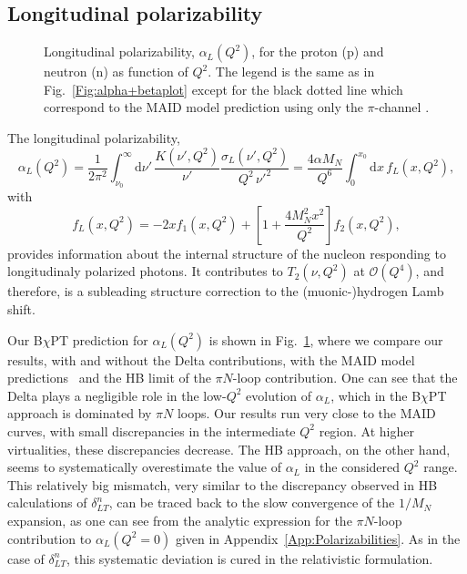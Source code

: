 \documentclass[11pt,preprint,tightenlines,
showpacs,preprintnumbers,amsmath,amssymb,superscriptaddress,a4paper,nofootinbib]{revtex4-1}
\def\beq{\begin{equation}}
\def\eeq{\end{equation}}
\def\al{\alpha}
\def\nn{\nonumber}
\def\dd{\mathrm{d}}
\begin{document}
\subsection{Longitudinal polarizability}

\begin{figure}[hbt]
\begin{center}
\hspace{0.5cm}
\caption{Longitudinal polarizability, $\alpha_L (Q^2)$, for the proton  (p) and neutron (n) as function of $Q^2$. The legend is the same as in Fig.~\ref{Fig:alpha+betaplot} except for the black dotted line which correspond to the MAID model prediction using only the $\pi$-channel \cite{Drechsel:2002ar}.  \label{Fig:alphaLplot}}
\end{center}
\end{figure}

The longitudinal polarizability,
\beq
\alpha_L (Q^2)= \frac{1}{2 \pi^2} \int_{\nu_0}^\infty\! \dd\nu'\, \frac{K(\nu',Q^2)}{\nu'}              \frac{\sigma_L (\nu',Q^2)}{Q^2\, \nu'^2} = \frac{4 \al M_N}{Q^6}\int_0^{x_0}\! \dd x \, f_L(x,Q^2),\label{Eq:alphaLQ2}
\eeq
with
\beq
f_L(x,Q^2)=-2xf_1(x,Q^2)+\left[1+\frac{4M_N^2 x^2}{Q^2}\right]f_2(x,Q^2),\nn
\eeq
provides information about the internal structure of the nucleon responding to longitudinaly polarized photons. 
It contributes to $T_2(\nu,Q^2)$ at $\mathcal{O}(Q^4)$, and therefore, is a  subleading structure correction to the (muonic-)hydrogen Lamb shift.

Our B$\chi$PT prediction for $\alpha_L(Q^2)$ is shown in Fig.~\ref{Fig:alphaLplot}, 
where we compare our results, with and without the Delta contributions, with the MAID model predictions~\cite{Drechsel:2000ct,Drechsel:1998hk,Drechsel:2002ar,private-Lothar} and the HB limit of the $\pi N$-loop contribution. One can see that the Delta plays a negligible role in the low-$Q^2$ evolution of $\alpha_L$, which in the B$\chi$PT approach is dominated by $\pi N$ loops.
Our results run very close to the MAID curves, with small discrepancies in the intermediate $Q^2$ region.
At higher virtualities, these discrepancies decrease.
The HB approach, on the other hand, seems to systematically overestimate the value of $\alpha_L$ in the considered $Q^2$ range. 
This relatively big mismatch, very similar to the discrepancy observed in HB calculations of $\delta_{LT}^n$, can be traced back to the slow convergence of the $1/M_N$ expansion, as one can see from the analytic expression for the $\pi N$-loop contribution to $\alpha_L(Q^2=0)$ given in  Appendix~\ref{App:Polarizabilities}.  As in the case of $\delta_{LT}^n$, this systematic deviation is cured in the relativistic formulation. 
\end{document}
